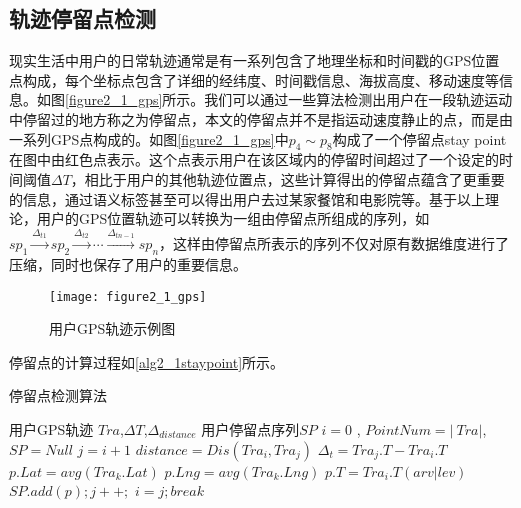 \subsection{轨迹停留点检测}
现实生活中用户的日常轨迹通常是有一系列包含了地理坐标和时间戳的GPS位置点构成，每个坐标点包含了详细的经纬度、时间戳信息、海拔高度、移动速度等信息。如图\ref{figure2_1_gps}所示。我们可以通过一些算法检测出用户在一段轨迹运动中停留过的地方称之为停留点，本文的停留点并不是指运动速度静止的点，而是由一系列GPS点构成的。如图\ref{figure2_1_gps}中$p_{4} \sim p_{8}$构成了一个停留点stay point在图中由红色点表示。这个点表示用户在该区域内的停留时间超过了一个设定的时间阈值$\Delta T$，相比于用户的其他轨迹位置点，这些计算得出的停留点蕴含了更重要的信息，通过语义标签甚至可以得出用户去过某家餐馆和电影院等。基于以上理论，用户的GPS位置轨迹可以转换为一组由停留点所组成的序列，如$sp_{1}\overset{\Delta_{t1}}{\rightarrow} sp_{2}\overset{\Delta_{t2}}{\rightarrow}\cdots \overset{\Delta_{tn-1}}{\rightarrow}sp_{n}$，这样由停留点所表示的序列不仅对原有数据维度进行了压缩，同时也保存了用户的重要信息。
\begin{figure}[H]
\label{figure2_1_gps}
\centering
\texttt{[image: figure2\_1\_gps]}
\caption{用户GPS轨迹示例图}
\label{fig:2_1}
\end{figure}
\par 停留点的计算过程如\ref{alg2_1staypoint}所示。
\begin{algorithm}[htb]
\caption{停留点检测算法}
\label{alg2_1staypoint}
\begin{algorithmic}[1] %
				\REQUIRE 用户GPS轨迹 $Tra$,$\Delta T$,$\Delta_{distance}$
				\ENSURE 用户停留点序列$SP$
				\STATE $i = 0$ , $PointNum= \left| \ Tra \right|$,$SP = Null$
				\STATE $j = i+1$
				\STATE $distance=Dis(Tra_{i},Tra_{j})$
				\STATE $\Delta_{t}=Tra_{j}.T-Tra_{i}.T$
				\STATE $p.Lat = avg(Tra_{k}.Lat)  $
				\STATE $p.Lng = avg(Tra_{k}.Lng)$
				\STATE $p.T = Tra_{i}.T(arv|lev)$%
				\STATE $SP .add(p) ;j++; $
				\ENDIF				
				\ENDIF				
				\ENDWHILE
				\STATE $i=j ; break$
				\ENDWHILE
				\STATE {}
\end{algorithmic}
\end{algorithm}
